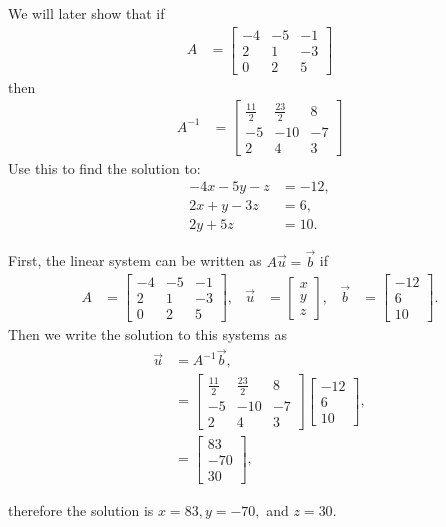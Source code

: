 \begin{example}
We will later show that if 
%
\begin{align*}
A & = \begin{bmatrix}
-4 &  -5 &  -1 \\ 2 &  1 &  -3 \\ 0 &  2 &  5
\end{bmatrix}
\end{align*}
then 
%
\begin{align*}
A^{-1} & = \begin{bmatrix}
\frac{11}{2} & \frac{23}{2} & 8 \\
-5 & -10 & -7 \\ 2 & 4 & 3
\end{bmatrix}
\end{align*}
Use this to find the solution to:
%
\begin{align*}
-4 x-5y -z & = -12, \\
2 x + y - 3 z & = 6, \\
2y + 5z & = 10. 
\end{align*}

\solution

First, the linear system can be written as $A\vec{u}=\vec{b}$ if 
\begin{align*}
	A & = 
\begin{bmatrix}
	-4 & -5 & -1 \\
	2 &1 & -3 \\
	0 & 2 & 5 
\end{bmatrix},
& \vec{u} & = 
\begin{bmatrix}
	x \\ y\\ z
\end{bmatrix}, & \vec{b} & = 
\begin{bmatrix}
	-12 \\ 6 \\ 10 
\end{bmatrix}.
\end{align*}
Then we write the solution to this systems as 
\begin{align*}
\vec{u} & = A^{-1} \vec{b}, \\
& = \begin{bmatrix}
\frac{11}{2} & \frac{23}{2} & 8 \\
-5 & -10 & -7 \\ 2 & 4 & 3
\end{bmatrix}
\begin{bmatrix}
-12 \\ 6 \\ 10 
\end{bmatrix}, \\
& = \begin{bmatrix}
83 \\ -70 \\ 30
\end{bmatrix},
\end{align*}

therefore the solution is $x=83, y=-70,$ and $z=30$.  


\end{example}


